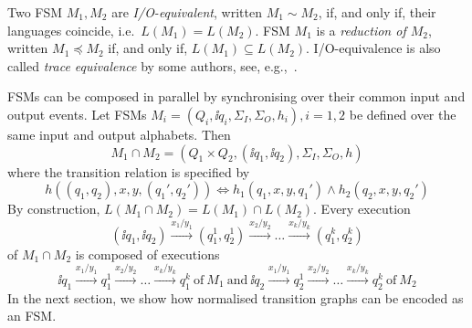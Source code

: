 
Two FSM $M_1, M_2$ are \emph{I/O-equivalent}, written $M_1\sim M_2$, if, and
only if, their languages coincide, i.e.~$L(M_1) = L(M_2)$. FSM $M_1$ is a
\emph{reduction of $M_2$}, written $M_1 \preceq M_2$ if, and only if, $L(M_1)
\subseteq L(M_2)$. I/O-equivalence is also called \emph{trace equivalence} by
some authors, see, e.g.,~\cite{luo_test_1994}.


FSMs can be composed in parallel by synchronising over their common input and
output events. Let FSMs $M_i=(Q_i, \ii{q_i}, \Sigma_I, \Sigma_O,  h_i), i =
1,2$ be defined over the same input and output alphabets. Then
$$
M_1 \cap M_2 = (Q_1\times Q_2, (\ii{q_1},\ii{q_2}),\Sigma_I, \Sigma_O, h)
$$
where the transition relation is specified by
$$
h((q_1,q_2),x,y,(q_1',q_2')) \Leftrightarrow h_1(q_1,x,y,q_1') \wedge h_2(q_2,x,y,q_2')
$$
By construction, $L(M_1 \cap M_2) = L(M_1) \cap L(M_2)$. Every execution
$$
(\ii{q_1},\ii{q_2}) \xrightarrow{x_1/y_1} (q_1^1,q_2^1)
\xrightarrow{x_2/y_2} \dots \xrightarrow{x_k/y_k} (q_1^{k},q_2^{k})
$$
of
$M_1\cap M_2$
is composed of executions
$$
\ii{q_1} \xrightarrow{x_1/y_1} q_1^1
\xrightarrow{x_2/y_2} \dots \xrightarrow{x_k/y_k} q_1^{k}\
\text{of}\ M_1\ \text{and}\
\ii{q_2} \xrightarrow{x_1/y_1} q_2^1
\xrightarrow{x_2/y_2} \dots \xrightarrow{x_k/y_k} q_2^{k}\
\text{of}\ M_2
$$
In the next section, we show how normalised transition graphs can be encoded
as an FSM.
